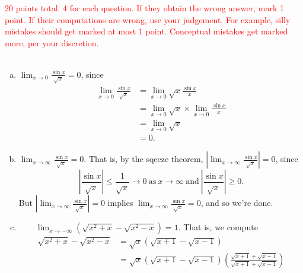 \documentclass[12pt]{article}
\begin{document}
\vspace{2em}
\noindent
\textcolor{red}{\Large 20 points total. 4 for each question. If they obtain the wrong answer, mark 1 point. If their computations are wrong, use your judgement. For example, silly mistakes should get marked at most 1 point. Conceptual mistakes get marked more, per your discretion.}
\\
\\
\begin{enumerate}[a)]
\item{}
  \qquad $ \lim_{x \to 0} \displaystyle \frac{\sin x}{\sqrt{x}} = 0$, since 
  \begin{equation*}
    \begin{split}
\lim_{x \to 0} \displaystyle \frac{\sin x}{\sqrt{x}} & =
    \lim_{x \to 0} \sqrt{x} \frac{\sin x}{x} 
    \\
    & = \lim_{x \to 0 } \sqrt{x} \times
  \lim_{x \to 0} \frac{\sin x}{x} 
  \\
  & = \lim_{x \to 0 } \sqrt{x} 
  \\
  & = 0.
\end{split}
\end{equation*}
    \item{}
        \vspace{4em}
    \qquad $ \displaystyle \lim_{x \to \infty} \displaystyle \frac{\sin
    x}{\sqrt{x}}= 0$. That is, by the sqeeze theorem, $ | \displaystyle \lim_{x \to \infty}\frac{\sin x}{\sqrt{x}}|= 0$, since
    \begin{equation*}
      | \displaystyle \frac{\sin x}{\sqrt{x}}| \le \frac{1}{\sqrt{x}} \to 0 \ \text{as} \ x
      \to \infty \ \text{and} \ | \displaystyle \frac{\sin x}{\sqrt{x}}| \ge 0.
    \end{equation*} 
\qquad But $ | \displaystyle \lim_{x \to \infty}\frac{\sin x}{\sqrt{x}}|= 0$ implies 
$ \displaystyle \lim_{x \to \infty} \displaystyle \frac{\sin
    x}{\sqrt{x}}= 0$, and so we're done.
    \item{}
        \vspace{4em}
        $ \qquad \displaystyle \lim_{x \to -\infty}(\sqrt{x^2 + x} - \sqrt{x^2
        - x}) =1$. That is, we compute
        \begin{equation*}
        \begin{split}
        \sqrt{x^2 + x} - \sqrt{x^2
        - x} & = \sqrt{x}\left( \sqrt{x+1} - \sqrt{x-1} \right)
        \\
        & = \sqrt{x}\left( \sqrt{x+1} - \sqrt{x-1} \right)\left( \frac{\sqrt{x+1} + \sqrt{x-1}}{\sqrt{x+1} + \sqrt{x-1}} \right)

\end{split}
\end{equation*}
\end{enumerate}
\end{document}
